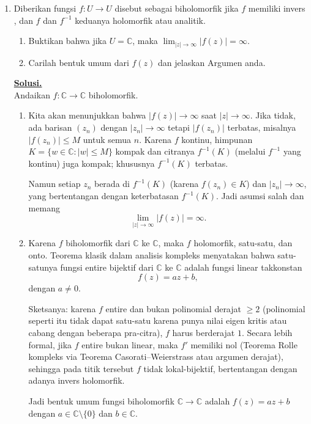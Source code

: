 \documentclass[12pt,twoside]{article}
\newenvironment{solution}
{
	\par\noindent\textbf{\underline{Solusi.}}\\
}
{
	\par
}
\begin{document}
\begin{enumerate}
  \item Diberikan fungsi $f:U\to U$ disebut sebagai biholomorfik jika $f$ memiliki invers , dan $f$ dan $f^{-1}$ keduanya holomorfik atau analitik.
        \begin{enumerate}
          \item [(a)] Buktikan bahwa jika $U=\mathbb{C}$, maka
                $\displaystyle \lim_{|z|\to \infty}|f(z)|=\infty$.
          \item[(b)] Carilah bentuk umum dari $f(z)$ dan jelaskan Argumen anda.
        \end{enumerate}
        \begin{solution}
          Andaikan $f:\mathbb C\to\mathbb C$ biholomorfik.
          \begin{enumerate}
            \item[(a)] Kita akan menunjukkan bahwa $|f(z)|\to\infty$ saat $|z|\to\infty$. Jika tidak, ada barisan $(z_n)$ dengan $|z_n|\to\infty$ tetapi $|f(z_n)|$ terbatas, misalnya $|f(z_n)|\le M$ untuk semua $n$. Karena $f$ kontinu, himpunan $K=\{w\in\mathbb C:|w|\le M\}$ kompak dan citranya $f^{-1}(K)$ (melalui $f^{-1}$ yang kontinu) juga kompak; khususnya $f^{-1}(K)$ terbatas.

                  Namun setiap $z_n$ berada di $f^{-1}(K)$ (karena $f(z_n)\in K$) dan $|z_n|\to\infty$, yang bertentangan dengan keterbatasan $f^{-1}(K)$. Jadi asumsi salah dan memang
                  \[
                    \lim_{|z|\to\infty}|f(z)|=\infty.
                  \]

            \item[(b)] Karena $f$ biholomorfik dari $\mathbb C$ ke $\mathbb C$, maka $f$ holomorfik, satu-satu, dan onto. Teorema klasik dalam analisis kompleks menyatakan bahwa satu-satunya fungsi entire bijektif dari $\mathbb C$ ke $\mathbb C$ adalah fungsi linear takkonstan
                  \[
                    f(z)=az+b,
                  \]
                  dengan $a\ne0$.

                  Sketsanya: karena $f$ entire dan bukan polinomial derajat $\ge2$ (polinomial seperti itu tidak dapat satu-satu karena punya nilai eigen kritis atau cabang dengan beberapa pra-citra), $f$ harus berderajat $1$. Secara lebih formal, jika $f$ entire bukan linear, maka $f'$ memiliki nol (Teorema Rolle kompleks via Teorema Casorati–Weierstrass atau argumen derajat), sehingga pada titik tersebut $f$ tidak lokal-bijektif, bertentangan dengan adanya invers holomorfik.

                  Jadi bentuk umum fungsi biholomorfik $\mathbb C\to\mathbb C$ adalah $f(z)=az+b$ dengan $a\in\mathbb C\setminus\{0\}$ dan $b\in\mathbb C$.
          \end{enumerate}
        \end{solution}


\end{enumerate}
\end{document}
